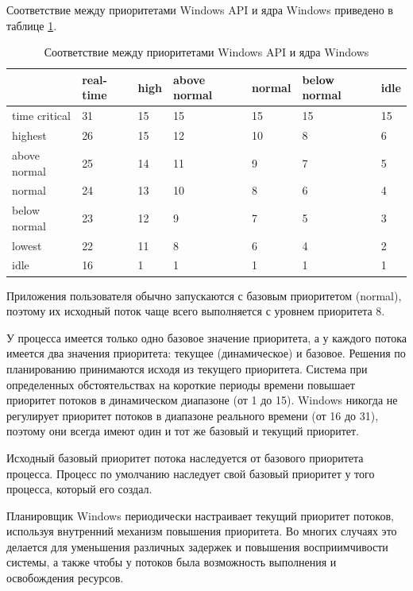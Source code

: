 \documentclass[a4paper,oneside,14pt]{extarticle}
\begin{document}
Соответствие между приоритетами Windows API и ядра Windows приведено в таблице \ref{tbl:priority}.
\begin{table}[h]
    \caption{Соответствие между приоритетами Windows API и ядра Windows \cite[c.~479]{windows}}
	\begin{center}
		\begin{tabular}{|l|p{45pt}|p{45pt}|p{45pt}|p{45pt}|p{45pt}|p{45pt}|} 
			\hline
			{} & {real-time} & {high} & {above normal} & {normal} & {below normal} & {idle}\\
			\hline
			{time critical} & 31 & 15 & 15 & 15 & 15 & 15 \\
			\hline
			{highest} & 26 & 15 & 12 & 10 & 8 & 6 \\
			\hline
			{above normal} & 25 & 14 & 11 & 9 & 7 & 5 \\
			\hline
			{normal} & 24 & 13 & 10 & 8 & 6 & 4 \\
			\hline
			{below normal} & 23 & 12 & 9 & 7 & 5 & 3 \\
			\hline
			{lowest} & 22 & 11 & 8 & 6 & 4 & 2 \\
			\hline
			{idle} & 16 & 1 & 1 & 1 & 1 & 1 \\
			\hline
		\end{tabular}
	\end{center}
	\label{tbl:priority}
\end{table}

Приложения пользователя обычно запускаются с базовым приоритетом (normal), поэтому их исходный поток чаще всего выполняется с уровнем приоритета 8. 

У процесса имеется только одно базовое значение приоритета, а у каждого потока имеется два значения приоритета: текущее (динамическое) и базовое.
Решения по планированию принимаются исходя из текущего приоритета.
Система при определенных обстоятельствах на короткие периоды времени повышает приоритет потоков в динамическом диапазоне (от 1 до 15).
Windows никогда не регулирует приоритет потоков в диапазоне реального времени (от 16 до 31), поэтому они всегда имеют один и тот же базовый и текущий приоритет.

Исходный базовый приоритет потока наследуется от базового приоритета процесса.
Процесс по умолчанию наследует свой базовый приоритет у того процесса, который его создал.

Планировщик Windows периодически настраивает текущий приоритет потоков, используя внутренний механизм повышения приоритета.
Во многих случаях это делается для уменьшения различных задержек и повышения восприимчивости системы, а также чтобы у потоков была возможность выполнения и освобождения ресурсов.  
\end{document}
